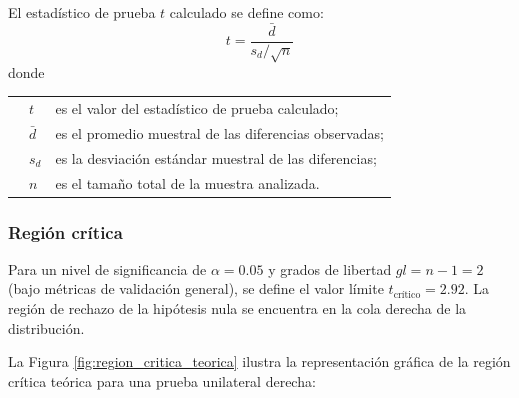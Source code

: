 El estadístico de prueba $t$ calculado se define como:
\begin{equation}
t = \frac{\bar{d}}{s_d / \sqrt{n}}
\end{equation}
\noindent donde

\noindent\begin{tabular}{@{} p{1cm} l p{8.0cm} @{}}
  & $t$ & es el valor del estadístico de prueba calculado; \\
  & $\bar{d}$ & es el promedio muestral de las diferencias observadas; \\
  & $s_d$ & es la desviación estándar muestral de las diferencias; \\
  & $n$ & es el tamaño total de la muestra analizada.
\end{tabular}

\subsubsection{Región crítica}
Para un nivel de significancia de $\alpha = 0.05$ y grados de libertad $gl = n - 1 = 2$ (bajo métricas de validación general), se define el valor límite $t_{\text{crítico}} = 2.92$. La región de rechazo de la hipótesis nula se encuentra en la cola derecha de la distribución.

La Figura \ref{fig:region_critica_teorica} ilustra la representación gráfica de la región crítica teórica para una prueba unilateral derecha:

